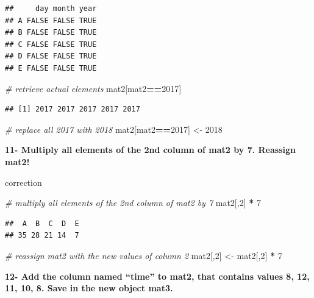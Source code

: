 \documentclass[]{book}
\newenvironment{Shaded}{\begin{snugshade}}{\end{snugshade}}
\newcommand{\CommentTok}[1]{\textcolor[rgb]{0.56,0.35,0.01}{\textit{#1}}}
\newcommand{\DecValTok}[1]{\textcolor[rgb]{0.00,0.00,0.81}{#1}}
\newcommand{\NormalTok}[1]{#1}
\newcommand{\OperatorTok}[1]{\textcolor[rgb]{0.81,0.36,0.00}{\textbf{#1}}}
\newcommand{\StringTok}[1]{\textcolor[rgb]{0.31,0.60,0.02}{#1}}
\begin{document}
\begin{verbatim}
##     day month year
## A FALSE FALSE TRUE
## B FALSE FALSE TRUE
## C FALSE FALSE TRUE
## D FALSE FALSE TRUE
## E FALSE FALSE TRUE
\end{verbatim}

\begin{Shaded}
\begin{Highlighting}[]
\CommentTok{# retrieve actual elements}
\NormalTok{mat2[mat2}\OperatorTok{==}\DecValTok{2017}\NormalTok{]}
\end{Highlighting}
\end{Shaded}

\begin{verbatim}
## [1] 2017 2017 2017 2017 2017
\end{verbatim}

\begin{Shaded}
\begin{Highlighting}[]
\CommentTok{# replace all 2017 with 2018}
\NormalTok{mat2[mat2}\OperatorTok{==}\DecValTok{2017}\NormalTok{] <-}\StringTok{ }\DecValTok{2018}
\end{Highlighting}
\end{Shaded}

\textbf{11- Multiply all elements of the 2nd column of mat2 by 7. Reassign mat2!}

correction

\begin{Shaded}
\begin{Highlighting}[]
\CommentTok{# multiply all elements of the 2nd column of mat2 by 7}
\NormalTok{mat2[,}\DecValTok{2}\NormalTok{] }\OperatorTok{*}\StringTok{ }\DecValTok{7}
\end{Highlighting}
\end{Shaded}

\begin{verbatim}
##  A  B  C  D  E 
## 35 28 21 14  7
\end{verbatim}

\begin{Shaded}
\begin{Highlighting}[]
\CommentTok{# reassign mat2 with the new values of column 2}
\NormalTok{mat2[,}\DecValTok{2}\NormalTok{] <-}\StringTok{ }\NormalTok{mat2[,}\DecValTok{2}\NormalTok{] }\OperatorTok{*}\StringTok{ }\DecValTok{7}
\end{Highlighting}
\end{Shaded}

\textbf{12- Add the column named ``time'' to mat2, that contains values 8, 12, 11, 10, 8. Save in the new object mat3.}
\end{document}
